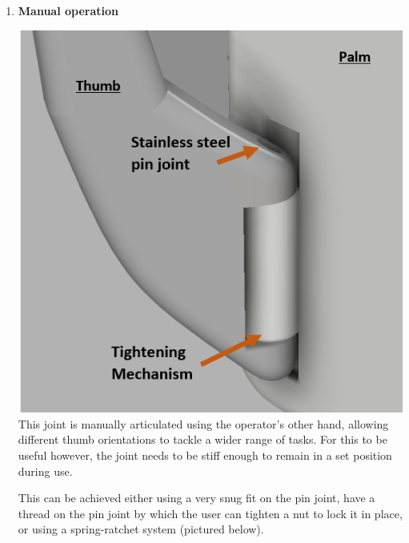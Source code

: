 \documentclass[12pt,3p]{report}
\begin{document}
\begin{multicols}{2}
\begin{enumerate}
			\item \textbf{Manual operation} {
				
				\includegraphics[scale=0.48]{man_thumb.PNG}
				This joint is manually articulated using the operator's other hand, allowing different thumb orientations to tackle a wider range of tasks. For this to be useful however, the joint needs to be stiff enough to remain in a set position during use. 
				
				This can be achieved either using a very snug fit on the pin joint, have a thread on the pin joint by which the user can tighten a nut to lock it in place, or using a spring-ratchet system (pictured below). 
				
}
\end{enumerate}
\end{multicols}
\end{document}
